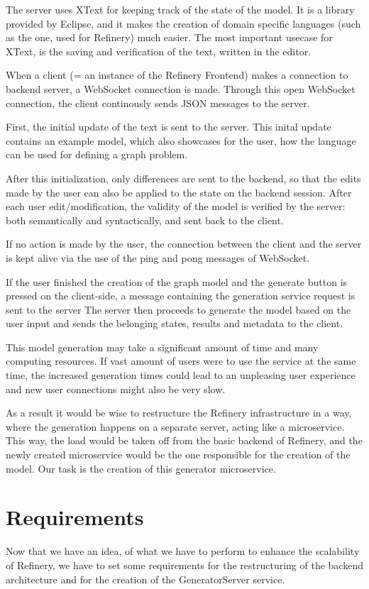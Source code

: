 	The server uses XText for keeping track of the state of the model. It is a library provided
	by Eclipse, and it makes the creation of domain specific languages (such as the one, used for Refinery)
	much easier. The most important usecase for XText, is the saving and verification of the text, 
	written in the editor.

	When a client (= an instance of the Refinery Frontend) makes a connection to backend server, a WebSocket 
	connection is made. Through this open WebSocket connection, the client continously sends JSON messages to
	the server.

	First, the initial update of the text is sent to the server.
	This inital update contains an example model, which also showcases for the user, how the language can be used
	for defining a graph problem. 
	
	After this initialization, only differences are sent to the backend, so that 
	the edits made by the user can also be applied to the state on the backend session. 
	After each user edit/modification, the
	validity of the model is verified by the server: both semantically and syntactically, and sent back to the client.

	If no action is made by the user, the connection between the client and the server
	is kept alive via the use of the ping and pong messages of WebSocket.

	If the user finished the creation of the graph model and the generate button is pressed 
	on the client-side, a message containing the generation service request is sent to the server 
	The server then proceeds to generate the model based on the user input and sends the belonging 
	states, results and metadata to the client.

	This model generation may take a significant amount of time and many computing resources. 
	If vast amount of users were to use 
	the service at the same time, the increased generation times could lead to an unpleasing user experience and 
	new user connections might also be very slow. 
	
	As a result it would be wise to restructure the Refinery infrastructure in a way, 
	where the generation happens on a separate server,
	acting like a microservice. This way, the load would be taken off from 
	the basic backend of Refinery, and the newly created microservice would be the one responsible for
	the creation of the model.
	Our task is the creation of this generator microservice.

\section{Requirements} \label{requirements}
Now that we have an idea, of what we have to perform to enhance the scalability of Refinery, we have to set some requirements for the
restructuring of the backend architecture and for the creation of the GeneratorServer service. 

